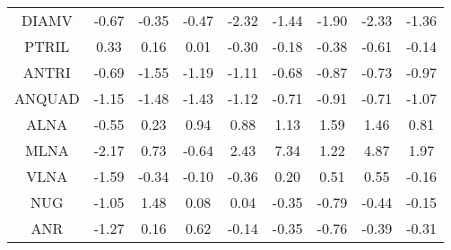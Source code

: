 \begin{longtable}{ | c || c | c | c | c | c | c | c || c |}
DIAMV &  \cellcolor[HTML]{FFEFEF} -0.67 &  \cellcolor[HTML]{FFF7F7} -0.35 &  \cellcolor[HTML]{FFF7F7} -0.47 &  \cellcolor[HTML]{FFC7C7} -2.32 &  \cellcolor[HTML]{FFD7D7} -1.44 &  \cellcolor[HTML]{FFCFCF} -1.90 &  \cellcolor[HTML]{FFC7C7} -2.33 &  \cellcolor[HTML]{FFDFDF} -1.36 \\
PTRIL &  \cellcolor[HTML]{F7F7FF} 0.33 &  \cellcolor[HTML]{F7F7FF} 0.16 &  \cellcolor[HTML]{FFFFFF} 0.01 &  \cellcolor[HTML]{FFF7F7} -0.30 &  \cellcolor[HTML]{FFF7F7} -0.18 &  \cellcolor[HTML]{FFF7F7} -0.38 &  \cellcolor[HTML]{FFEFEF} -0.61 &  \cellcolor[HTML]{FFFFFF} -0.14 \\
ANTRI &  \cellcolor[HTML]{FFEFEF} -0.69 &  \cellcolor[HTML]{FFD7D7} -1.55 &  \cellcolor[HTML]{FFDFDF} -1.19 &  \cellcolor[HTML]{FFE7E7} -1.11 &  \cellcolor[HTML]{FFEFEF} -0.68 &  \cellcolor[HTML]{FFE7E7} -0.87 &  \cellcolor[HTML]{FFEFEF} -0.73 &  \cellcolor[HTML]{FFE7E7} -0.97 \\
ANQUAD &  \cellcolor[HTML]{FFDFDF} -1.15 &  \cellcolor[HTML]{FFD7D7} -1.48 &  \cellcolor[HTML]{FFD7D7} -1.43 &  \cellcolor[HTML]{FFDFDF} -1.12 &  \cellcolor[HTML]{FFEFEF} -0.71 &  \cellcolor[HTML]{FFE7E7} -0.91 &  \cellcolor[HTML]{FFEFEF} -0.71 &  \cellcolor[HTML]{FFE7E7} -1.07 \\
ALNA &  \cellcolor[HTML]{FFEFEF} -0.55 &  \cellcolor[HTML]{F7F7FF} 0.23 &  \cellcolor[HTML]{E7E7FF} 0.94 &  \cellcolor[HTML]{E7E7FF} 0.88 &  \cellcolor[HTML]{DFDFFF} 1.13 &  \cellcolor[HTML]{D7D7FF} 1.59 &  \cellcolor[HTML]{D7D7FF} 1.46 &  \cellcolor[HTML]{E7E7FF} 0.81 \\
MLNA &  \cellcolor[HTML]{FFC7C7} -2.17 &  \cellcolor[HTML]{EFEFFF} 0.73 &  \cellcolor[HTML]{FFEFEF} -0.64 &  \cellcolor[HTML]{BFBFFF} 2.43 &  \cellcolor[HTML]{4848FF} 7.34 &  \cellcolor[HTML]{DFDFFF} 1.22 &  \cellcolor[HTML]{8787FF} 4.87 &  \cellcolor[HTML]{CFCFFF} 1.97 \\
VLNA &  \cellcolor[HTML]{FFD7D7} -1.59 &  \cellcolor[HTML]{FFF7F7} -0.34 &  \cellcolor[HTML]{FFFFFF} -0.10 &  \cellcolor[HTML]{FFF7F7} -0.36 &  \cellcolor[HTML]{F7F7FF} 0.20 &  \cellcolor[HTML]{EFEFFF} 0.51 &  \cellcolor[HTML]{EFEFFF} 0.55 &  \cellcolor[HTML]{FFF7F7} -0.16 \\
NUG &  \cellcolor[HTML]{FFE7E7} -1.05 &  \cellcolor[HTML]{D7D7FF} 1.48 &  \cellcolor[HTML]{FFFFFF} 0.08 &  \cellcolor[HTML]{FFFFFF} 0.04 &  \cellcolor[HTML]{FFF7F7} -0.35 &  \cellcolor[HTML]{FFEFEF} -0.79 &  \cellcolor[HTML]{FFF7F7} -0.44 &  \cellcolor[HTML]{FFFFFF} -0.15 \\
ANR &  \cellcolor[HTML]{FFDFDF} -1.27 &  \cellcolor[HTML]{FFFFFF} 0.16 &  \cellcolor[HTML]{EFEFFF} 0.62 &  \cellcolor[HTML]{FFFFFF} -0.14 &  \cellcolor[HTML]{FFF7F7} -0.35 &  \cellcolor[HTML]{FFEFEF} -0.76 &  \cellcolor[HTML]{FFF7F7} -0.39 &  \cellcolor[HTML]{FFF7F7} -0.31 \\

\end{longtable}
